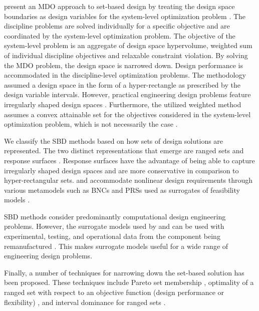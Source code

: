 \citeauthor{Hannapel2014} present an \ac{MDO} approach to set-based design by treating the design space boundaries as design variables for the system-level optimization problem \cite{Hannapel2014}. The discipline problems are solved individually for a specific objective and are coordinated by the system-level optimization problem. The objective of the system-level problem is an aggregate of design space hypervolume, weighted sum of individual discipline objectives and relaxable constraint violation. By solving the \ac{MDO} problem, the design space is narrowed down. Design performance is accommodated in the discipline-level optimization problems. The methodology assumed a design space in the form of a hyper-rectangle as prescribed by the design variable intervals. However, practical engineering design problems feature irregularly shaped design spaces \cite{Shahan2012}. Furthermore, the utilized weighted method assumes a convex attainable set for the objectives considered in the system-level optimization problem, which is not necessarily the case \cite{WardAthan1996}.

We classify the \ac{SBD} methods based on how sets of design solutions are represented. The two distinct representations that emerge are ranged sets \cite{Qureshi2014,Nahm2005,Olewnik2004,Liu2008,Suh2007} and response surfaces \cite{Kizer2014,Shahan2012,Yannou2003,Ge2005}. Response surfaces have the advantage of being able to capture irregularly shaped design spaces and are more conservative in comparison to hyper-rectangular sets. \citeauthor{Shahan2012} and \citeauthor{Yannou2003} accommodate nonlinear design requirements through various metamodels such as \acp{BNC} and \acp{PRS} used as surrogates of feasibility models \cite{Shahan2012,Yannou2003}.

\ac{SBD} methods consider predominantly computational design engineering problems. However, the surrogate models used by \citeauthor{Shahan2012} and \citeauthor{Yannou2003} can be used with experimental, testing, and operational data from the component being remanufactured \cite{Shahan2012,Yannou2003}. This makes surrogate models useful for a wide range of engineering design problems.

Finally, a number of techniques for narrowing down the set-based solution has been proposed. These techniques include Pareto set membership \cite{Olewnik2004,Miller2018}, optimality of a ranged set with respect to an objective function (design performance or flexibility) \cite{Hannapel2014,Liu2008,Suh2007}, and interval dominance for ranged sets \cite{Malak2009,Miller2018}.

